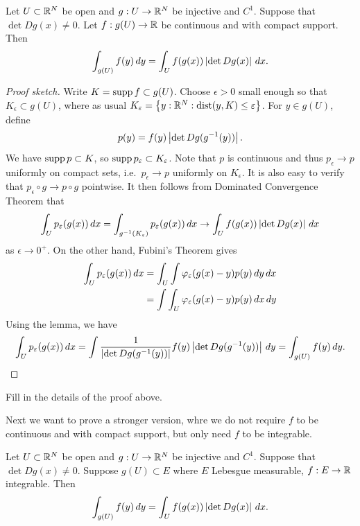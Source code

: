 \documentclass[a4paper]{article}
\begin{document}
\begin{thm}

  Let $U \subset \mathbb{R}^N$ be open and $g : U \to \mathbb{R}^N$ be injective and
  $C^1$. Suppose that $\det Dg (x) \neq 0$. Let $f : g(U) \to \mathbb{R}$ be
  continuous and with compact support. Then
  \[
    \int_{g(U)}  f(y) \, d y = \int_U f(g(x)) \left\lvert \det Dg(x)\right\rvert \, d x.
  \]
\end{thm}

\begin{proof}[Proof sketch]
  Write $K = \operatorname{supp} f \subset g(U)$. Choose $\epsilon > 0$ small enough
  so that $K_\epsilon \subset g(U)$, where as usual
  $K_\varepsilon = \left\{ y : \mathbb{R}^N : \operatorname{dist} (y, K) \leq \varepsilon \right\}$.
  For $y \in g(U)$, define
  \[
    p(y) = f(y) \left\lvert \det Dg (g^{-1} (y))\right\rvert.
  \]
  We have $\operatorname{supp} p \subset K$, so $\operatorname{supp} p_\varepsilon \subset K_\varepsilon$.
  Note that $p$ is continuous and thus $p_\epsilon \to p$ uniformly on
  compact sets, i.e.\ $p_\epsilon \to p$ uniformly on $K_\epsilon$. It is
  also easy to verify that $p_\epsilon \circ g \to p \circ g$ pointwise.
  It then follows from Dominated Convergence Theorem that
  \[
    \int_U p_\varepsilon (g(x)) \, d x
    = \int_{g^{-1}(K_\varepsilon)} p_\varepsilon (g(x)) \, d x
    \to \int_U f(g(x)) \left\lvert \det Dg(x)\right\rvert \, d x
  \]
  as $\epsilon \to 0^+$. On the other hand, Fubini's Theorem gives
  \begin{align*}
    \int_U p_\varepsilon (g(x)) \, d x
     & = \int_U \int \varphi_\varepsilon (g(x) - y) p(y) \, d y \, d x \\
     & = \int \int_U \varphi_\varepsilon (g(x) - y) p(y) \, d x \, d y \\
  \end{align*}
  Using the lemma, we have
  \begin{align*}
    \int_U p_\varepsilon (g(x)) \, d x
    = \int \frac{1}{\left\lvert \det Dg(g^{-1}(y))\right\rvert} f(y)
    \left\lvert \det Dg(g^{-1}(y))\right\rvert \, d y
    = \int_{g(U)} f(y) \, d y.
  \end{align*}
\end{proof}

\begin{ex}
  Fill in the details of the proof above.
\end{ex}

Next we want to prove a stronger version, whre we do not require $f$ to be
continuous and with compact support, but only need $f$ to be integrable.

\begin{thm}[CoV]

  Let $U \subset \mathbb{R}^N$ be open and $g : U \to \mathbb{R}^N$ be injective and
  $C^1$. Suppose that $\det Dg (x) \neq 0$. Suppose $g(U) \subset E$ where
  $E$ Lebesgue measurable, $f : E \to \mathbb{R}$ integrable. Then
  \[
    \int_{g(U)}  f(y) \, d y = \int_U f(g(x)) \left\lvert \det Dg(x)\right\rvert \, d x.
  \]
\end{thm}
\end{document}
